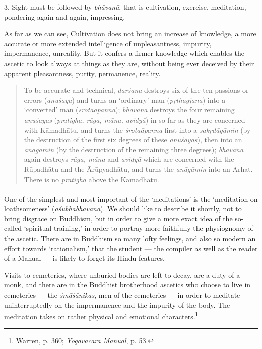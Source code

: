 \documentclass[a4paper, 11pt, oneside, english, landscape]{article}
\begin{document}
3. Sight must be followed by \emph{bhāvanā}, that is cultivation, exercise, meditation, pondering again and again, impressing.

As far as we can see, Cultivation does not bring an increase of knowledge, a more accurate or more extended intelligence of unpleasantness, impurity, impermanence, unreality. But it confers a firmer knowledge which enables the ascetic to look always at things as they are, without being ever deceived by their apparent pleasantness, purity, permanence, reality.
\begin{quotation}
\small
To be accurate and technical, \emph{darśana} destroys six of the ten passions or errors (\emph{anuśaya}) and turns an `ordinary' man (\emph{pṛthagjana}) into a `converted' man (\emph{srotaāpanna}); \emph{bhāvanā} destroys the four remaining \emph{anuśayas} (\emph{pratigha, rāga, māna, avidyā}) in so far as they are concerned with Kāmadhātu, and turns the \emph{śrotaāpanna} first into a \emph{sakṛdāgāmin} (by the destruction of the first six degrees of these \emph{anuśayas}), then into an \emph{anāgāmin} (by the destruction of the remaining three degrees); \emph{bhāvanā} again destroys \emph{rāga, māna} and \emph{avidyā} which are concerned with the Rūpadhātu and the Ārūpyadhātu, and turns the \emph{anāgāmin} into an Arhat. There is no \emph{pratigha} above the Kāmadhātu.
\end{quotation}
\paragraph{}
One of the simplest and most important of the `meditations' is the `meditation on loathsomeness' (\emph{aśubhabhāvanā}). We should like to describe it shortly, not to bring disgrace on Buddhism, but in order to give a more exact idea of the so-called `spiritual training,' in order to portray more faithfully the physiognomy of the ascetic. There are in Buddhism so many lofty feelings, and also so modern an effort towards `rationalism,' that the student --- the compiler as well as the reader of a Manual --- is likely to forget its Hindu features.

Visits to cemeteries, where unburied bodies are left to decay, are a duty of a monk, and there are in the Buddhist brotherhood ascetics who choose to live in cemeteries --- the \emph{śmāśānikas}, men of the cemeteries --- in order to meditate uninterruptedly on the impermanence and the impurity of the body. The meditation takes on rather physical and emotional characters.\footnote{Warren, p. 360; \emph{Yogāvacara Manual}, p. 53.}
\end{document}
